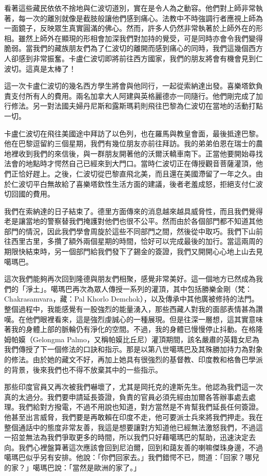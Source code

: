 看著這些藏民依依不捨地與仁波切道別，實在是令人為之動容。他們對上師非常執著，每一次的離別就像是截肢般讓他們感到痛心。法教中不時強調行者應視上師為一面鏡子，反映眾生真實圓滿的佛心。然而，許多人仍然非常執著於上師外在的形相。雖然上師外在顯現的形相會加深我們對加持的覺受，可是同時亦會令我們變得脆弱。當我們的藏族朋友們為了仁波切的離開而感到痛心的同時，我們這幾個西方人卻感到非常振奮。卡盧仁波切即將前往西方國家，我們的朋友將會有機會見到仁波切。這真是太棒了！

這一次卡盧仁波切的幾名西方學生將會與他同行，一起從索納達出發。喜樂塔欽負責支付所有人的費用。兩名加拿大人阿建與英格麗德亦一同隨行。他們剛完成了加行修法。另一對法國夫婦丹尼斯和露斯瑪莉則飛往巴黎為仁波切在當地的活動打點一切。

卡盧仁波切在飛往美國途中拜訪了以色列，也在羅馬與教皇會面，最後抵達巴黎。他在巴黎逗留約三個星期，我們有幾位朋友亦前往拜訪。我的弟弟伯恩在瑞士的農地裡收到我們的來信後，與一群朋友開著他的沃爾沃轎車南下。正當他要開始尋找法會的地點時才愕然自己已經來到大門口。當時仁波切正在傳授觀音菩薩灌頂，他們正恰好趕上。之後，仁波切從巴黎直飛北美，而且還在美國滯留了一年之久。由於仁波切平白無故給了喜樂塔欽性生活方面的建議，後者老羞成怒，拒絕支付仁波切回國的費用。

我們在索納達的日子結束了。德里方面傳來的消息越來越具威脅性，而且我們覺得老是讓當地的警察替我們掩護對他們也很不公平。然而由於各個部門都不知道其他部門的情況，因此我們學會周旋於這些不同部門之間，然後從中取巧。我們下山前往西里古里，多攢了額外兩個星期的時間，恰好可以完成最後的加行。當這兩周的期限快結束時，另一個部門給我們發下了錫金的簽證，我們又開開心心地上山去見噶瑪巴。

這次我們能夠再次回到隆德與朋友們相聚，感覺非常美好。這一個地方已然成為我們的「淨土」。噶瑪巴再次為眾人傳授一系列的灌頂，其中包括勝樂金剛（梵：Chakrasamvara，藏：Pal
Khorlo
Demchok），以及傳承中其他廣被修持的法門。整個過程中，我能感覺有一股強烈的能量湧入，那些西藏人對我的面部表情甚為讚嘆。在他們眼裡看來，這是強烈虔誠心的一種展現。但是往深一層想，這其實意味著我的身體上部的脈輪仍有淨化的空間。不過，我的身體已慢慢停止抖動。在格隆姆帕嫫（Gelongma
Palmo，又稱帕嫫比丘尼）灌頂期間，該名嚴肅的英籍女尼為我們傳授了下一個修法的口訣和指示。那是以第八世噶瑪巴及其殊勝加持力為對象的修法。由於她的藏文不好，再加上她具有很強烈的基督教、印度教和格魯巴學派的背景，後來我們也不得不放棄其中的一些指示。

那些印度官員又再次被我們嚇壞了，尤其是岡托克的達斯先生。他認為我們這一次真的太過分。我們要申請延長簽證，負責的官員必須先經由加爾各答辦事處去處理。我們給對方撥電，不過不用說也知道，對方當然是不肯幫我們延長任何簽證。他甚至出言威脅，我們要是再敢賴在印度不走，他可要派士兵來將我們押走。我在整個通話中的態度非常友善，我這是想要讓對方知道他已經無法激怒我們，不過這一招並無法為我們爭取更多的時間，所以我們只好藉噶瑪巴的幫助，迅速決定去向。我們心裡盤算著這次應該會回到尼泊爾，回到和藹友善的喇嘛傑珠身邊，不過噶瑪巴似乎另有安排。他說：「你們回家去。」我們錯愕不已，問道：「回家？哪兒的家？」噶瑪巴說：「當然是歐洲的家了。」

